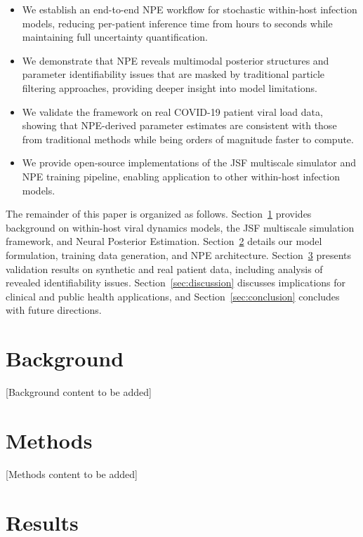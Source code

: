 \documentclass{article}
\begin{document}
\begin{itemize}
	\item We establish an end-to-end NPE workflow for stochastic within-host infection models, reducing per-patient inference time from hours to seconds while maintaining full uncertainty quantification.
	\item We demonstrate that NPE reveals multimodal posterior structures and parameter identifiability issues that are masked by traditional particle filtering approaches, providing deeper insight into model limitations.
	\item We validate the framework on real COVID-19 patient viral load data, showing that NPE-derived parameter estimates are consistent with those from traditional methods while being orders of magnitude faster to compute.
	\item We provide open-source implementations of the JSF multiscale simulator and NPE training pipeline, enabling application to other within-host infection models.
\end{itemize}

The remainder of this paper is organized as follows. Section~\ref{sec:background} provides background on within-host viral dynamics models, the JSF multiscale simulation framework, and Neural Posterior Estimation. Section~\ref{sec:methods} details our model formulation, training data generation, and NPE architecture. Section~\ref{sec:results} presents validation results on synthetic and real patient data, including analysis of revealed identifiability issues. Section~\ref{sec:discussion} discusses implications for clinical and public health applications, and Section~\ref{sec:conclusion} concludes with future directions.


\section{Background}
\label{sec:background}

[Background content to be added]


\section{Methods}
\label{sec:methods}

[Methods content to be added]


\section{Results}
\label{sec:results}
\end{document}
